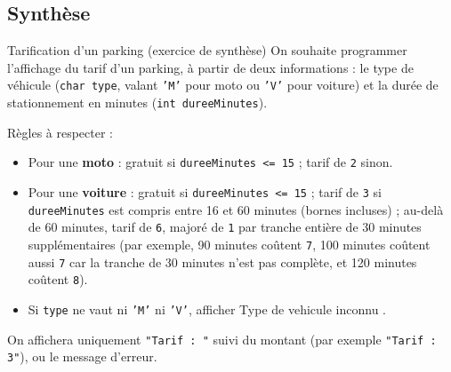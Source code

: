 \subsection{Synthèse}

\begin{UPSTIexercice}{Tarification d'un parking (exercice de synthèse)}
    On souhaite programmer l'affichage du tarif d'un parking, à partir de deux informations : le type de véhicule (\texttt{char type}, valant \texttt{'M'} pour moto ou \texttt{'V'} pour voiture) et la durée de stationnement en minutes (\texttt{int dureeMinutes}).

    Règles à respecter :
    \begin{itemize}
        \item Pour une \textbf{moto} : gratuit si \texttt{dureeMinutes <= 15} ; tarif de \texttt{2} sinon.
        \item Pour une \textbf{voiture} : gratuit si \texttt{dureeMinutes <= 15} ; tarif de \texttt{3} si \texttt{dureeMinutes} est compris entre 16 et 60 minutes (bornes incluses) ; au-delà de 60 minutes, tarif de \texttt{6}, majoré de \texttt{1} par tranche entière de 30 minutes supplémentaires (par exemple, 90 minutes coûtent \texttt{7}, 100 minutes coûtent aussi \texttt{7} car la tranche de 30 minutes n'est pas complète, et 120 minutes coûtent \texttt{8}).
        \item Si \texttt{type} ne vaut ni \texttt{'M'} ni \texttt{'V'}, afficher \og Type de vehicule inconnu \fg.
    \end{itemize}
    On affichera uniquement \texttt{"Tarif : "} suivi du montant (par exemple \texttt{"Tarif : 3"}), ou le message d'erreur.




\end{UPSTIexercice}

